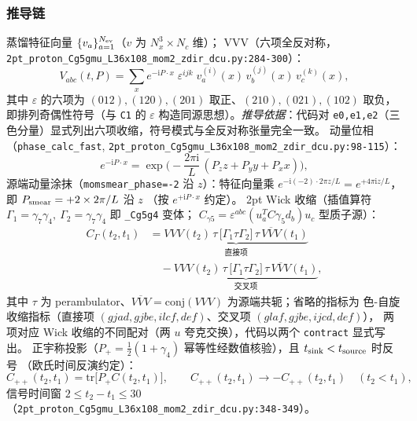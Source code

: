 \documentclass[UTF8]{ctexart}
\begin{document}
\subsubsection{推导链}
蒸馏特征向量 $\{v_a\}_{a=1}^{N_{\rm ev}}$（$v$ 为 $N_x^3\times N_c$ 维）；
VVV（六项全反对称，\texttt{\nolinkurl{2pt_proton_Cg5gmu_L36x108_mom2_zdir_dcu.py:284-300}}）：
\begin{equation}\label{eq:vvv}
V_{abc}(t,P)=\sum_{x} e^{-\mathrm i P\cdot x}\;\varepsilon^{ijk}\; v^{(i)}_a(x)\,v^{(j)}_b(x)\,v^{(k)}_c(x),
\end{equation}
其中 $\varepsilon$ 的六项为 $(012),(120),(201)$ 取正、$(210),(021),(102)$ 取负，
即排列奇偶性符号（与 \texttt{C1} 的 $\varepsilon$ 构造同源思想）。\emph{推导依据}：代码对
\texttt{e0,e1,e2}（三色分量）显式列出六项收缩，符号模式与全反对称张量完全一致。
动量位相（\texttt{phase\_calc\_fast}, \texttt{\nolinkurl{2pt_proton_Cg5gmu_L36x108_mom2_zdir_dcu.py:98-115}}）：
\begin{equation}\label{eq:phase}
e^{-\mathrm i P\cdot x}=\exp\!\Big(-\frac{2\pi\mathrm i}{L}\,(P_z z+P_y y+P_x x)\Big),
\end{equation}
源端动量涂抹（\texttt{momsmear\_phase=-2} 沿 $z$）：特征向量乘
$e^{-\mathrm i(-2)\cdot 2\pi z/L}=e^{+4\pi\mathrm i z/L}$，即 $P_{\rm smear}=+2\times 2\pi/L$ 沿 $z$
（按 $e^{+\mathrm i P\cdot x}$ 约定）。
2pt Wick 收缩（插值算符 $\Gamma_1=\gamma_7\gamma_4,\ \Gamma_2=\gamma_7\gamma_4$ 即 \texttt{\_Cg5g4} 变体；
$C_{\gamma5}=\varepsilon^{abc}(u_a^T C\gamma_5 d_b)u_c$ 型质子源）：
\begin{equation}\label{eq:twopt}
\begin{aligned}
C_{\Gamma}(t_2,t_1)&=\underbrace{VVV(t_2)\,\tau\,\big[\Gamma_1\tau\Gamma_2\big]\,\tau\,\overline{VVV}(t_1)}_{\text{直接项}} \\
&\quad-\underbrace{VVV(t_2)\,\tau\,\big[\Gamma_1\tau\Gamma_2\big]\,\tau\,\overline{VVV}(t_1)}_{\text{交叉项}},
\end{aligned}
\end{equation}
其中 $\tau$ 为 perambulator、$\overline{VVV}=\mathrm{conj}(VVV)$ 为源端共轭；省略的指标为
色-自旋收缩指标（直接项 $(gjad,gjbe,ilcf,def)$、交叉项 $(glaf,gjbe,ijcd,def)$），
两项对应 Wick 收缩的不同配对（两 $u$ 夸克交换），代码以两个 \texttt{contract} 显式写出。
正宇称投影（$P_+=\tfrac12(1+\gamma_4)$ 幂等性经数值核验），且 $t_{\rm sink}<t_{\rm source}$ 时反号
（欧氏时间反演约定）：
\begin{equation}\label{eq:pp}
C_{++}(t_2,t_1)=\mathrm{tr}\big[P_+ C(t_2,t_1)\big],\qquad
C_{++}(t_2,t_1)\to -C_{++}(t_2,t_1)\quad(t_2<t_1),
\end{equation}
信号时间窗 $2\le t_2-t_1\le 30$（\texttt{\nolinkurl{2pt_proton_Cg5gmu_L36x108_mom2_zdir_dcu.py:348-349}}）。
\end{document}
